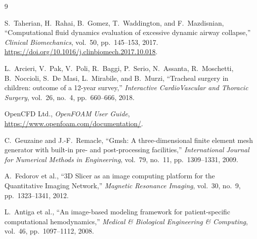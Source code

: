\documentclass[11pt,a4paper]{article}
\begin{document}
\begin{thebibliography}{9}

S.~Taherian, H.~Rahai, B.~Gomez, T.~Waddington, and F.~Mazdisnian,
``Computational fluid dynamics evaluation of excessive dynamic airway
collapse,''
\textit{Clinical Biomechanics}, vol.~50, pp.~145--153, 2017.
\url{https://doi.org/10.1016/j.clinbiomech.2017.10.018}.

L.~Arcieri, V.~Pak, V.~Poli, R.~Baggi, P.~Serio, N.~Assanta, R.~Moschetti,
B.~Noccioli, S.~De Masi, L.~Mirabile, and B.~Murzi,
``Tracheal surgery in children: outcome of a 12-year survey,''
\textit{Interactive CardioVascular and Thoracic Surgery}, vol.~26, no.~4,
pp.~660--666, 2018.

OpenCFD Ltd.,
\textit{OpenFOAM User Guide},
\url{https://www.openfoam.com/documentation/}.

C.~Geuzaine and J.-F.~Remacle,
``Gmsh: A three-dimensional finite element mesh generator with built-in pre-
and post-processing facilities,''
\textit{International Journal for Numerical Methods in Engineering},
vol.~79, no.~11, pp.~1309--1331, 2009.

A.~Fedorov et al.,
``3D Slicer as an image computing platform for the Quantitative Imaging
Network,''
\textit{Magnetic Resonance Imaging}, vol.~30, no.~9, pp.~1323--1341, 2012.

L.~Antiga et al.,
``An image-based modeling framework for patient-specific computational
hemodynamics,''
\textit{Medical \& Biological Engineering \& Computing}, vol.~46,
pp.~1097--1112, 2008.

\end{thebibliography}
\end{document}
